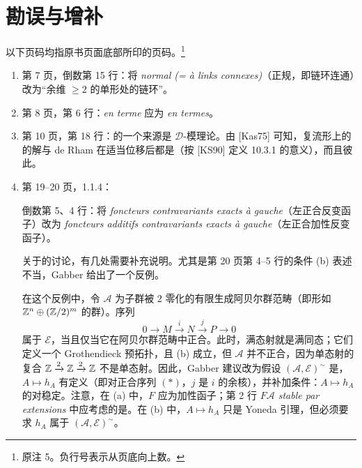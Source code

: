 \chapter*{勘误与增补}
以下页码均指原书页面底部所印的页码。\footnote{原注 5。负行号表示从页底向上数。}
\begin{enumerate}[label=\arabic*.,leftmargin=2.5em,itemsep=.65\baselineskip]
\item 第 7 页，倒数第 15 行：将 \emph{normal (= à links connexes)}（正规，即链环连通）改为“余维 $\ge2$ 的单形处的链环”。
\item 第 8 页，第 6 行：\emph{en terme} 应为 \emph{en termes}。
\item 第 10 页，第 18 行：的一个来源是 $\mathcal D$-模理论。由 [Kas75] 可知，复流形上的的解与 de Rham 在适当位移后都是（按 [KS90] 定义 10.3.1 的意义），而且彼此。
\item 第 19--20 页，1.1.4：

倒数第 5、4 行：将 \emph{foncteurs contravariants exacts à gauche}（左正合反变函子）改为 \emph{foncteurs additifs contravariants exacts à gauche}（左正合加性反变函子）。

关于的讨论，有几处需要补充说明。尤其是第 20 页第 4--5 行的条件 (b) 表述不当，Gabber 给出了一个反例。

在这个反例中，令 $\mathcal A$ 为子群被 $2$ 零化的有限生成阿贝尔群范畴（即形如 $\mathbb Z^n\oplus(\mathbb Z/2)^m$ 的群）。序列
\begin{equation*}\tag{$*$}
0\longrightarrow M\xrightarrow{i}N\xrightarrow{j}P\longrightarrow0
\end{equation*}
属于 $\mathcal E$，当且仅当它在阿贝尔群范畴中正合。此时，满态射就是满同态；它们定义一个 Grothendieck 预拓扑，且 (b) 成立，但 $\mathcal A$ 并不正合，因为单态射的复合 $\mathbb Z\xrightarrow{2}\mathbb Z\xrightarrow{2}\mathbb Z$ 不是单态射。因此，Gabber 建议改为假设 $(\mathcal A,\mathcal E)^\sim$ 是，$A\mapsto h_A$ 有定义（即对正合序列 $(*)$，$j$ 是 $i$ 的余核），并补加条件：$A\mapsto h_A$ 的对稳定。注意，在 (a) 中，$F$ 应为加性函子；第 2 行 \emph{$F\mathcal A$ stable par extensions} 中应考虑的是。在 (b) 中，$A\mapsto h_A$ 只是 Yoneda 引理，但必须要求 $h_A$ 属于 $(\mathcal A,\mathcal E)^\sim$。


\end{enumerate}
